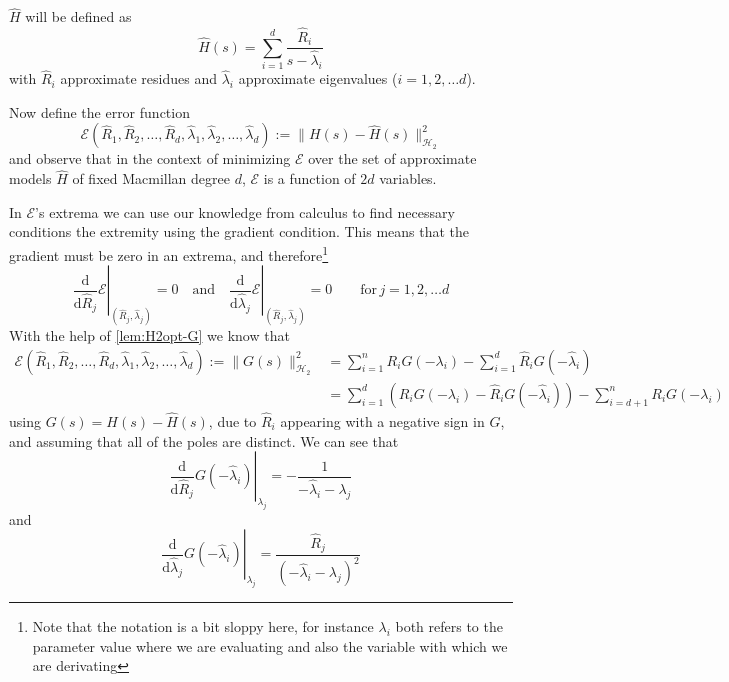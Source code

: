 \documentclass{article}
\newcommand{\diff}{\mathrm{d}}
\begin{document}
	$\hat{H}$ will be defined as 
	\begin{equation}
		\hat{H}(s)=\sum_{i=1}^d\frac{\hat{R}_i}{s-\hat{\lambda}_i}
	\end{equation}
	with $\hat{R}_i$ approximate residues and $\hat{\lambda}_i$ approximate eigenvalues ($i=1,2, \dots d$). 
	
	Now define the error function 
	$$\mathcal{E}\left(\hat{R}_1, \hat{R}_2, \dots, \hat{R}_d,\hat{\lambda}_1, \hat{\lambda}_2, \dots, \hat{\lambda}_d \right):=\|H(s)-\hat{H}(s)\|_{\mathcal{H}_2}^2$$
	and observe that in the context of minimizing $\mathcal{E}$ over the set of approximate models $\hat{H}$ of fixed Macmillan degree $d$, $\mathcal{E}$ is a function of $2d$ variables. 
	
	
	In $\mathcal{E}$'s extrema we can use our knowledge from calculus to find necessary conditions the extremity using the gradient condition. This means that the gradient must be zero in an extrema, and therefore\footnote{Note that the notation is a bit sloppy here, for instance $\lambda_i$ both refers to the parameter value where we are evaluating and also the variable with which we are derivating}
	\begin{equation*}
		\left.\frac{\diff}{\diff \hat{R}_j} \mathcal{E}\right|_{(\hat{R}_j, \hat{\lambda}_j)} = 0\quad \mathrm{and} \quad \left.\frac{\diff}{\diff \hat{\lambda}_j} \mathcal{E} \right|_{(\hat{R}_j, \hat{\lambda}_j)} = 0 \quad \quad \mathrm{for} \, j=1,2, \dots d
	\end{equation*}
	With the help of \autoref{lem:H2opt-G} we know that 
	\begin{equation}
		\begin{aligned}
		\mathcal{E}\left(\hat{R}_1, \hat{R}_2, \dots, \hat{R}_d,\hat{\lambda}_1, \hat{\lambda}_2, \dots, \hat{\lambda}_d \right):=\|G(s)\|_{\mathcal{H}_2}^2 &= \sum_{i=1}^{n} R_i G(-\lambda_i) - \sum_{i=1}^{d} \hat{R}_i G(-\hat{\lambda}_i) \\&=
		\sum_{i=1}^{d} \left(R_i  G(-\lambda_i) -\hat{R}_i G(-\hat{\lambda}_i) \right) - \sum_{i=d+1}^{n} {R}_i G(-{\lambda}_i) 
		\end{aligned}
	\end{equation}
	using $G(s) = H(s) - \hat{H}(s)$, due to $\hat{R}_i$ appearing with a negative sign in $G$, and assuming that all of the poles are distinct. We can see that 
	\begin{equation}
		\left.\frac{\diff}{\diff \hat{R}_j} G(-\hat{\lambda}_i)\right|_{\lambda_j} = - \frac{1}{-\hat{\lambda}_i-\lambda_j}
	\end{equation}
	and 
	\begin{equation}
		\left.\frac{\diff}{\diff \hat{\lambda}_j} G(-\hat{\lambda}_i)\right|_{\lambda_j} = \frac{\hat{R}_j}{\left(-\hat{\lambda}_i-\lambda_j\right)^2}
	\end{equation}
	
\end{document}
